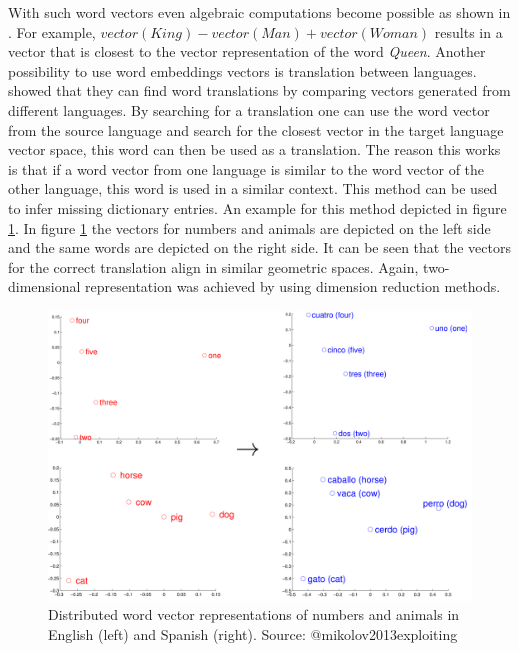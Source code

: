 \documentclass[]{krantz}
\begin{document}
With such word vectors even algebraic computations become possible as shown in \citet{mikolov2013linguistic}. For example, \(vector(King)-vector(Man) + vector(Woman)\) results in a vector that is closest to the vector representation of the word \emph{Queen}. Another possibility to use word embeddings vectors is translation between languages. \citet{mikolov2013exploiting} showed that they can find word translations by comparing vectors generated from different languages. By searching for a translation one can use the word vector from the source language and search for the closest vector in the target language vector space, this word can then be used as a translation. The reason this works is that if a word vector from one language is similar to the word vector of the other language, this word is used in a similar context. This method can be used to infer missing dictionary entries. An example for this method depicted in figure \ref{fig:word-embedding3}. In figure \ref{fig:word-embedding3} the vectors for numbers and animals are depicted on the left side and the same words are depicted on the right side. It can be seen that the vectors for the correct translation align in similar geometric spaces. Again, two-dimensional representation was achieved by using dimension reduction methods.

\begin{figure}
\includegraphics[width=\textwidth]{figures/01-01-foundations-applications-of-modern-NLP/01-01_language} \caption{Distributed word vector representations of numbers and animals in English (left) and Spanish (right). Source: @mikolov2013exploiting}\label{fig:word-embedding3}
\end{figure}
\end{document}
